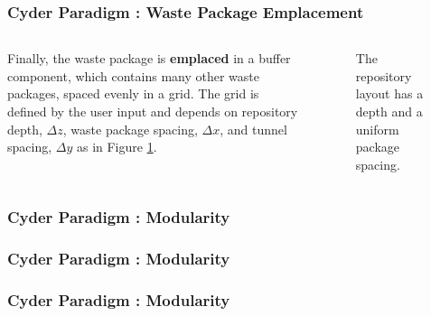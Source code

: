 \begin{frame}[ctb!]
  \frametitle{Cyder Paradigm : Waste Package Emplacement}
\footnotesize{
  \begin{columns}[c]
Finally, the waste package is \textbf{emplaced} in a buffer component, which 
contains many other waste packages, spaced evenly in a grid. The grid is 
defined by the user input and depends on repository depth, $\Delta z$, waste 
package spacing, $\Delta x$, and tunnel spacing, $\Delta y$ as in Figure 
\ref{fig:repo_layout}.

\begin{figure}[htbp!]
\begin{center}
\def\svgwidth{.5\textwidth}

\end{center}
\caption{The repository layout has a depth and a uniform package spacing.}
\label{fig:repo_layout}
\end{figure}
\end{columns}
  }
\end{frame}


\begin{frame}[ctb!]
  \frametitle{Cyder Paradigm : Modularity }
\begin{figure}[htbp!]
\begin{center}
\def\svgwidth{.6\textwidth}

\end{center}
\label{fig:modularity_layout}
\end{figure}
\end{frame}


\begin{frame}[ctb!]
  \frametitle{Cyder Paradigm : Modularity }
\begin{figure}[htbp!]
\begin{center}
\def\svgwidth{.6\textwidth}

\end{center}
\label{fig:modularity_circle}
\end{figure}
\end{frame}


\begin{frame}[ctb!]
  \frametitle{Cyder Paradigm : Modularity }
\begin{figure}[htbp!]
\begin{center}
\def\svgwidth{.6\textwidth}

\end{center}
\label{fig:modularity_colors}
\end{figure}
\end{frame}


